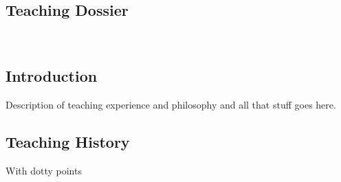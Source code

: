\begin{spacing}{1.2}
\section{Teaching Dossier}\\

\subsection{Introduction}
Description of teaching experience and philosophy and all that stuff goes here.\\

\subsection{Teaching History}
With dotty points\\

\end{spacing}
